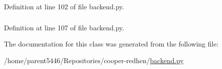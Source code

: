 Definition at line 102 of file backend.py.

\hypertarget{classbackend_1_1_spectrum_a3f6f55ba521257932bb08684e0181fa1}{
\subsubsection[{xy}]{}}
\label{classbackend_1_1_spectrum_a3f6f55ba521257932bb08684e0181fa1}


Definition at line 107 of file backend.py.



The documentation for this class was generated from the following file:\begin{DoxyCompactItemize}
\item 
/home/parent5446/Repositories/cooper-\/redhen/\hyperlink{backend_8py}{backend.py}\end{DoxyCompactItemize}
